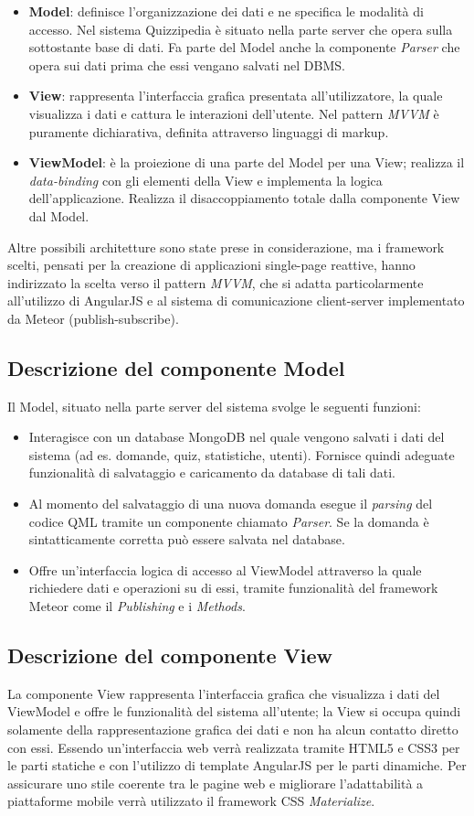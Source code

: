 \begin {itemize}
\item\textbf{Model}: definisce l'organizzazione dei dati e ne specifica le modalità di accesso. Nel sistema Quizzipedia è situato nella parte server che opera sulla sottostante base di dati. Fa parte del Model anche la componente \emph{Parser} che opera sui dati prima che essi vengano salvati nel DBMS.
\item\textbf{View}: rappresenta l'interfaccia grafica presentata all'utilizzatore, la quale visualizza i dati e cattura le interazioni dell'utente. Nel pattern \emph{MVVM} è puramente dichiarativa, definita attraverso linguaggi di markup. 
\item\textbf{ViewModel}: è la proiezione di una parte del Model per una View; realizza il \emph{data-binding} con gli elementi della View e implementa la logica dell'applicazione. 
Realizza il disaccoppiamento totale dalla componente View dal Model.
	\end {itemize}
	Altre possibili architetture sono state prese in considerazione, ma i framework scelti, pensati per la creazione di applicazioni single-page reattive, hanno indirizzato la scelta verso il pattern \emph{MVVM}, che si adatta particolarmente all'utilizzo di AngularJS e al sistema di comunicazione client-server implementato da Meteor (publish-subscribe).

	\subsection{Descrizione del componente Model}
	Il Model, situato nella parte server del sistema svolge le seguenti funzioni:
	\begin{itemize}
		\item Interagisce con un database MongoDB nel quale vengono salvati i dati del sistema (ad es. domande, quiz, statistiche, utenti). Fornisce quindi adeguate funzionalità di salvataggio e caricamento da database di tali dati.
		\item Al momento del salvataggio di una nuova domanda esegue il \emph{parsing} del codice QML tramite un componente chiamato \emph{Parser}. Se la domanda è sintatticamente corretta può essere salvata nel database.
		\item Offre un'interfaccia logica di accesso al ViewModel attraverso la quale richiedere dati e operazioni su di essi, tramite funzionalità del framework Meteor come il \emph{Publishing} e i \emph{Methods}.
	\end{itemize}
	\subsection{Descrizione del componente View}
	La componente View rappresenta l'interfaccia grafica che visualizza i dati del ViewModel e offre le funzionalità del sistema all'utente; la View si occupa quindi solamente della rappresentazione grafica dei dati e non ha alcun contatto diretto con essi. Essendo un'interfaccia web verrà realizzata tramite HTML5 e CSS3 per le parti statiche e con l'utilizzo di template AngularJS per le parti dinamiche. Per assicurare uno stile coerente tra le pagine web e migliorare l'adattabilità a piattaforme mobile verrà utilizzato il framework CSS \emph{Materialize}.
